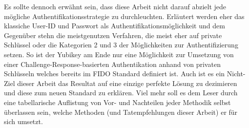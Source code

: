 Es sollte dennoch erwähnt sein, dass diese Arbeit nicht darauf abzielt jede mögliche Authentifikationsstrategie zu durchleuchten. Erläutert werden eher das klassiche User-ID und Passwort als Authentifikationsmöglichkeit und dem Gegenüber stehn die meistgenutzen Verfahren, die meist eher auf private Schlüssel oder die Kategorien 2 und 3 der Möglichkeiten zur Authentifizierung setzen. So ist der Yubikey am Ende nur eine Möglichkeit zur Umsetzung von einer Challenge-Response-basierten Authentikation anhand von privaten Schlüsseln welches bereits im FIDO Standard definiert ist. Auch ist es ein Nicht-Ziel dieser Arbeit das Resultat auf eine einzige perfekte Lösung zu dezimieren und diese zum neuen Standard zu erklären. Viel mehr soll es dem Leser durch eine tabellarische Auflistung von Vor- und Nachteilen jeder Methodik selbst überlassen sein, welche Methoden (und Tatempfehlungen dieser Arbeit) er für sich umsetzt.
